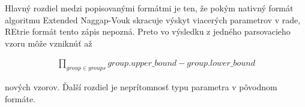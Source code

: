 Hlavný rozdiel medzi popisovanými formátmi je ten, že pokým nativný formát algoritmu Extended Naggap-Vouk skracuje výskyt viacerých parametrov v rade, REtrie formát tento zápis nepozná. Preto vo výsledku z jedného parsovacieho vzoru môže vzniknúť až 

\begin{align*}
\prod_{group \in groups} group.upper\_bound - group.lower\_bound
\end{align*}

nových vzorov. Ďalší rozdiel je neprítomnosť typu parametra v pôvodnom formáte.
